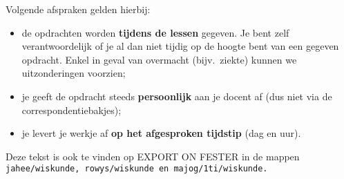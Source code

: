 \documentclass[11pt]{article}
\begin{document}
\noindent Volgende afspraken gelden hierbij:
\begin{itemize}
\item de opdrachten worden \textbf{tijdens de lessen} gegeven.
Je bent zelf verantwoordelijk of je al dan niet tijdig op de
hoogte bent van een gegeven opdracht. Enkel in geval van overmacht
(bijv.\ ziekte) kunnen we uitzonderingen voorzien;

\item je geeft de opdracht steeds \textbf{persoonlijk} aan je docent af
(dus niet via de correspondentiebakjes);

\item je levert je werkje af \textbf{op het afgesproken tijdstip} (dag en uur).
\end{itemize}

\begin{flushleft}
\noindent Deze tekst is ook te vinden op EXPORT ON FESTER in de
mappen \tt{jahee/wiskunde}, \tt{rowys/wiskunde} en
\tt{majog/1ti/wiskunde}.
\end{flushleft}
\end{document}
